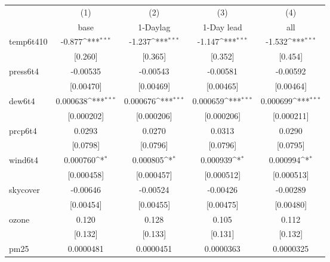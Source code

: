 {
\def\sym#1{\ifmmode^{#1}\else\(^{#1}\)\fi}
\begin{tabular}{l*{4}{c}}
\hline\hline
            &\multicolumn{1}{c}{(1)}&\multicolumn{1}{c}{(2)}&\multicolumn{1}{c}{(3)}&\multicolumn{1}{c}{(4)}\\
            &\multicolumn{1}{c}{base}&\multicolumn{1}{c}{1-Daylag}&\multicolumn{1}{c}{1-Day lead}&\multicolumn{1}{c}{all}\\
\hline
temp6t410   &      -0.877\sym{***}&      -1.237\sym{***}&      -1.147\sym{***}&      -1.532\sym{***}\\
            &     [0.260]         &     [0.365]         &     [0.352]         &     [0.454]         \\
[1em]
press6t4    &    -0.00535         &    -0.00543         &    -0.00581         &    -0.00592         \\
            &   [0.00470]         &   [0.00469]         &   [0.00465]         &   [0.00464]         \\
[1em]
dew6t4      &    0.000638\sym{***}&    0.000676\sym{***}&    0.000659\sym{***}&    0.000699\sym{***}\\
            &  [0.000202]         &  [0.000206]         &  [0.000206]         &  [0.000211]         \\
[1em]
prcp6t4     &      0.0293         &      0.0270         &      0.0313         &      0.0290         \\
            &    [0.0798]         &    [0.0796]         &    [0.0796]         &    [0.0795]         \\
[1em]
wind6t4     &    0.000760\sym{*}  &    0.000805\sym{*}  &    0.000939\sym{*}  &    0.000994\sym{*}  \\
            &  [0.000458]         &  [0.000457]         &  [0.000512]         &  [0.000513]         \\
[1em]
skycover    &    -0.00646         &    -0.00524         &    -0.00426         &    -0.00289         \\
            &   [0.00454]         &   [0.00455]         &   [0.00475]         &   [0.00480]         \\
[1em]
ozone       &       0.120         &       0.128         &       0.105         &       0.112         \\
            &     [0.132]         &     [0.133]         &     [0.131]         &     [0.132]         \\
[1em]
pm25        &   0.0000481         &   0.0000451         &   0.0000363         &   0.0000325         \\

\end{tabular}}

